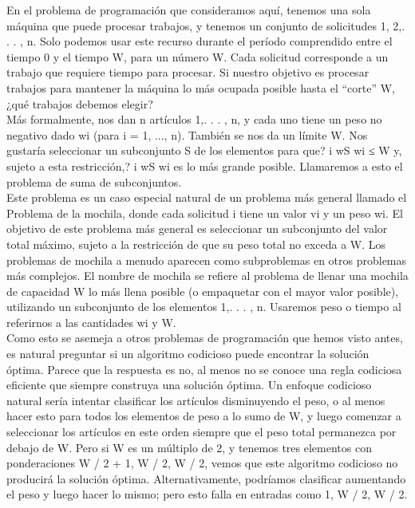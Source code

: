 \documentclass[a4paper, 12pt]{book}
\theoremstyle{dotless}
\begin{document}
En el problema de programación que consideramos aquí, tenemos una sola máquina que puede procesar trabajos, y tenemos un conjunto de solicitudes {1, 2,. . . , n}. Solo podemos usar este recurso durante el período comprendido entre el tiempo 0 y el tiempo W, para un número W. Cada solicitud corresponde a un trabajo que requiere tiempo para procesar. Si nuestro objetivo es procesar trabajos para mantener la máquina lo más ocupada posible hasta el ``corte'' W, ¿qué trabajos debemos elegir?\\

Más formalmente, nos dan n artículos {1,. . . , n}, y cada uno tiene un peso no negativo dado wi (para i = 1, ..., n). También se nos da un límite W. Nos gustaría seleccionar un subconjunto S de los elementos para que? i wS wi ≤ W y, sujeto a esta restricción,? i wS wi es lo más grande posible. Llamaremos a esto el problema de suma de subconjuntos.\\

Este problema es un caso especial natural de un problema más general llamado el Problema de la mochila, donde cada solicitud i tiene un valor vi y un peso wi. El objetivo de este problema más general es seleccionar un subconjunto del valor total máximo, sujeto a la restricción de que su peso total no exceda a W. Los problemas de mochila a menudo aparecen como subproblemas en otros problemas más complejos. El nombre de mochila se refiere al problema de llenar una mochila de capacidad W lo más llena posible (o empaquetar con el mayor valor posible), utilizando un subconjunto de los elementos {1,. . . , n}. Usaremos peso o tiempo al referirnos a las cantidades wi y W.\\

Como esto se asemeja a otros problemas de programación que hemos visto antes, es natural preguntar si un algoritmo codicioso puede encontrar la solución óptima. Parece que la respuesta es no, al menos no se conoce una regla codiciosa eficiente que siempre construya una solución óptima. Un enfoque codicioso natural sería intentar clasificar los artículos disminuyendo el peso, o al menos hacer esto para todos los elementos de peso a lo sumo de W, y luego comenzar a seleccionar los artículos en este orden siempre que el peso total permanezca por debajo de W. Pero si W es un múltiplo de 2, y tenemos tres elementos con ponderaciones {W / 2 + 1, W / 2, W / 2}, vemos que este algoritmo codicioso no producirá la solución óptima. Alternativamente, podríamos clasificar aumentando el peso y luego hacer lo mismo; pero esto falla en entradas como {1, W / 2, W / 2}.\\
\end{document}
